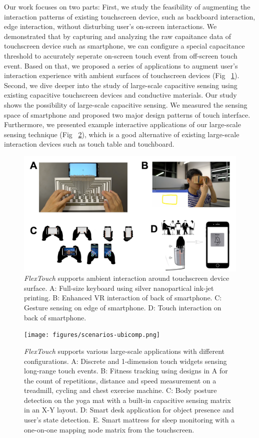 Our work focuses on two parts: First, we study the feasibility of augmenting the interaction patterns of existing touchscreen device, such as backboard interaction, edge interaction, without disturbing user's on-screen interactions. We demonstrated that by capturing and analyzing the raw capaitance data of touchscreen device such as smartphone, we can configure a special capacitance threshold to accurately seperate on-screen touch event from off-screen touch event. Based on that, we proposed a series of applications to augment user's interaction experience with ambient surfaces of touchscreen devices (Fig ~\ref{fig:small-scale-scenarios}). Second, we dive deeper into the study of large-scale capacitive sensing using existing capacitive touchscreen devices and conductive materials. Our study shows the possibility of large-scale capacitive sensing. We measured the sensing space of smartphone and proposed two major design patterns of touch interface. Furthermore, we presented example interactive applications of our large-scale sensing technique (Fig ~\ref{fig:large-scale-scenarios}), which is a good alternative of existing large-scale interaction devices such as touch table and touchboard.

\begin{figure}
    \centering
      \includegraphics[width=0.78\columnwidth]{figures/small-scale-scenarios.png}
      \setlength{\belowcaptionskip}{-6pt}
      \caption{\textit{FlexTouch} supports ambient interaction around touchscreen device surface. A: Full-size keyboard using silver nanopartical ink-jet printing. B: Enhanced VR interaction of back of smartphone. C: Gesture sensing on edge of smartphone. D: Touch interaction on back of smartphone.}
      \label{fig:small-scale-scenarios}
\end{figure}

\begin{figure}
\centering
  \texttt{[image: figures/scenarios-ubicomp.png]}
  \setlength{\belowcaptionskip}{-6pt}
  \caption{\textit{FlexTouch} supports various large-scale applications with different configurations. A: Discrete and 1-dimension touch widgets sensing long-range touch events. B: Fitness tracking using designs in A for the count of repetitions, distance and speed measurement on a treadmill, cycling and chest exercise machine. C: Body posture detection on the yoga mat with a built-in capacitive sensing matrix in an X-Y layout. D: Smart desk application for object presence and user's state detection. E. Smart mattress for sleep monitoring with a one-on-one mapping node matrix from the touchscreen.}
  \label{fig:large-scale-scenarios}
\end{figure}

